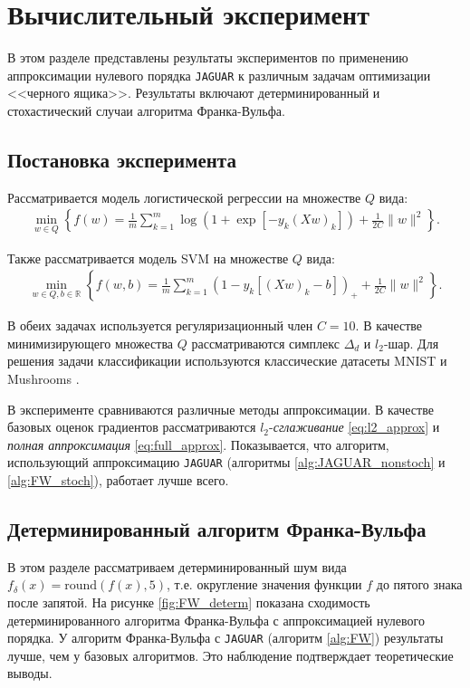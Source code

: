 \section{Вычислительный эксперимент} \label{section:experiments}

    В этом разделе представлены результаты экспериментов по применению аппроксимации нулевого порядка \texttt{JAGUAR} к различным задачам оптимизации <<черного ящика>>. Результаты включают детерминированный и стохастический случаи алгоритма Франка-Вульфа.
    
\subsection{Постановка эксперимента}

    Рассматривается модель логистической регрессии на множестве $Q$ вида:
    \begin{align*}
        \min_{w \in Q} \left\{ f(w) = \frac{1}{m} \sum_{k = 1}^{m} \log \left( 1 + \exp \left[ -y_k (Xw)_k \right] \right) + \frac{1}{2C} \| w \|^2 \right\}.
    \end{align*}

    Также рассматривается модель SVM на множестве $Q$ вида:
    \begin{align*}
        \min_{w \in Q, b \in \mathbb{R}} \left\{ f(w, b) = \frac{1}{m} \sum_{k = 1}^{m} \left( 1 - y_k [(Xw)_k - b] \right)_+ + \frac{1}{2C} \| w \|^2 \right\}.
    \end{align*}

    В обеих задачах используется регуляризационный член $C = 10$. В качестве минимизирующего множества $Q$ рассматриваются симплекс $\Delta_d$ и $l_2$-шар. Для решения задачи классификации используются классические датасеты MNIST \cite{deng2012mnist} и Mushrooms \cite{chang2011libsvm}.
    
    В эксперименте сравниваются различные методы аппроксимации. В качестве базовых оценок градиентов рассматриваются $l_2$-\textit{сглаживание} \eqref{eq:l2_approx} и \textit{полная аппроксимация} \eqref{eq:full_approx}. Показывается, что алгоритм, использующий аппроксимацию \texttt{JAGUAR} (алгоритмы \ref{alg:JAGUAR_nonstoch} и \ref{alg:FW_stoch}), работает лучше всего.

\subsection{Детерминированный алгоритм Франка-Вульфа}
    
    В этом разделе рассматриваем детерминированный шум вида $f_\delta(x) = \text{round}(f(x), 5)$, т.е. округление значения функции $f$ до пятого знака после запятой. На рисунке \ref{fig:FW_determ} показана сходимость детерминированного алгоритма Франка-Вульфа с аппроксимацией нулевого порядка. У алгоритм Франка-Вульфа с \texttt{JAGUAR} (алгоритм \ref{alg:FW}) результаты лучше, чем у базовых алгоритмов. Это наблюдение подтверждает теоретические выводы. 
    
